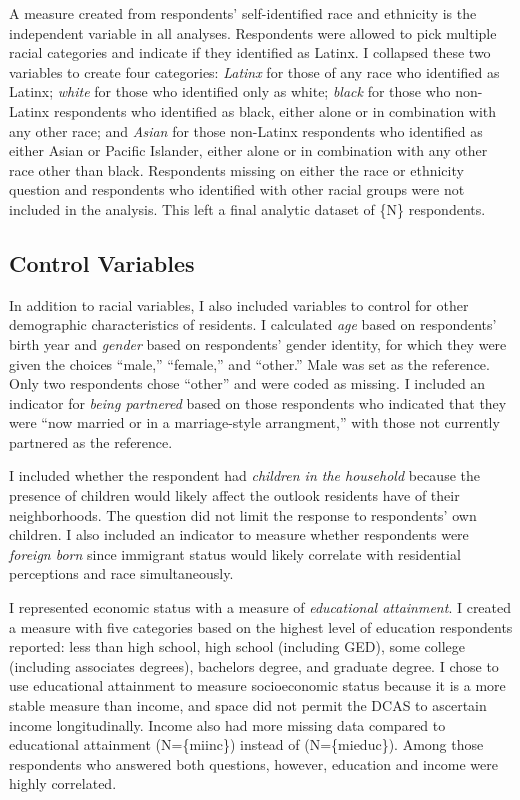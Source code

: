 \documentclass{baderart}
\begin{document}
A measure created from respondents' self-identified race and ethnicity is the independent variable in all analyses. Respondents were allowed to pick multiple racial categories and indicate if they identified as Latinx. I collapsed these two variables to create four categories: \emph{Latinx} for those of any race who identified as Latinx; \emph{white} for those who identified only as white; \emph{black} for those who non-Latinx respondents who identified as black, either alone or in combination with any other race; and \emph{Asian} for those non-Latinx respondents who identified as either Asian or Pacific Islander, either alone or in combination with any other race other than black. Respondents missing on either the race or ethnicity question and respondents who identified with other racial groups were not included in the analysis. This left a final analytic dataset of \{N\} respondents.

\subsection{Control Variables}\label{control-variables}

In addition to racial variables, I also included variables to control for other demographic characteristics of residents. I calculated \emph{age} based on respondents' birth year and \emph{gender} based on respondents' gender identity, for which they were given the choices ``male,'' ``female,'' and ``other.'' Male was set as the reference. Only two respondents chose ``other'' and were coded as missing. I included an indicator for \emph{being partnered} based on those respondents who indicated that they were ``now married or in a marriage-style arrangment,'' with those not currently partnered as the reference.

I included whether the respondent had \emph{children in the household} because the presence of children would likely affect the outlook residents have of their neighborhoods. The question did not limit the response to respondents' own children. I also included an indicator to measure whether respondents were \emph{foreign born} since immigrant status would likely correlate with residential perceptions and race simultaneously.

I represented economic status with a measure of \emph{educational attainment}. I created a measure with five categories based on the highest level of education respondents reported: less than high school, high school (including GED), some college (including associates degrees), bachelors degree, and graduate degree. I chose to use educational attainment to measure socioeconomic status because it is a more stable measure than income, and space did not permit the DCAS to ascertain income longitudinally. Income also had more missing data compared to educational attainment (N=\{miinc\}) instead of (N=\{mieduc\}). Among those respondents who answered both questions, however, education and income were highly correlated.
\end{document}

